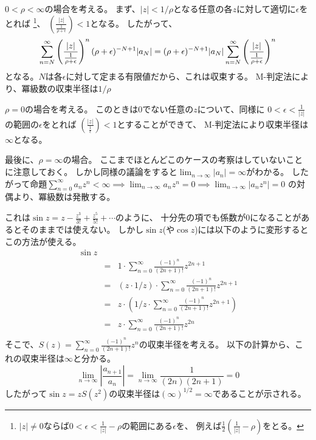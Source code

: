 \documentclass[a4paper]{jarticle}
\begin{document}
\begin{Proof}
            $0 < \rho<\infty$の場合を考える。
            まず、$|z|<1/\rho$となる任意の各$z$に対して適切に$\epsilon$をとれば
            \footnote{ $|z| \neq 0$ならば$0< \epsilon < \frac{1}{|z|} - \rho$の範囲にある$\epsilon$を、
            例えば$\frac{1}{2} \left(\frac{1}{|z|} - \rho \right)$をとる。 }、
            $\left( \frac{|z|}{\frac{1}{\rho+\epsilon}} \right)<1$となる。
            したがって、
            \begin{equation*}
                \sum_{n=N}^{\infty}{ \left( \frac{|z|}{\frac{1}{\rho+\epsilon}} \right)^{n} (\rho+\epsilon)^{-N+1} |a_N|} \\
                =(\rho+\epsilon)^{-N+1} |a_N| \sum_{n=N}^{\infty}{ \left( \frac{|z|}{\frac{1}{\rho+\epsilon}} \right)^{n}}
            \end{equation*}
            となる。$N$は各$\epsilon$に対して定まる有限値だから、これは収束する。
            M-判定法により、冪級数の収束半径は$1/\rho$

            $\rho=0$の場合を考える。
            このときは0でない任意の$z$について、同様に
            $ 0< \epsilon < \frac{1}{|z|}$の範囲の$\epsilon$をとれば
            $\left( \frac{|z|}{\frac{1}{\epsilon}} \right)<1$とすることができて、
            M-判定法により収束半径は$\infty$となる。

            最後に、$\rho=\infty$の場合。
            ここまでほとんどこのケースの考察はしていないことに注意しておく。
            しかし同様の議論をすると$\lim_{n \to \infty}{|a_n|}=\infty$がわかる。
            したがって命題$\sum_{n=0}^{\infty}{a_n z^n} < \infty \implies \lim_{n \to \infty}{a_n z^n}=0 \implies \lim_{n \to \infty}{|a_n z^n|}=0$
            の対偶より、冪級数は発散する。

            \QED
        \end{Proof}

        これは$\sin z=z-\frac{z^3}{3!}+\frac{z^5}{5!}+\cdots$のように、
        十分先の項でも係数が0になることがあるとそのままでは使えない。
        しかし$\sin z$(や$\cos z$)には以下のように変形するとこの方法が使える。
        \begin{eqnarray*}
            \sin z \\
            &=& 1 \cdot \sum_{n=0}^{\infty}{\frac{(-1)^{n}}{(2n+1)!}z^{2n+1}} \\
            &=& (z \cdot 1/z) \cdot \sum_{n=0}^{\infty}{\frac{(-1)^{n}}{(2n+1)!}z^{2n+1}} \\
            &=& z \cdot \left(1/z \cdot \sum_{n=0}^{\infty}{\frac{(-1)^{n}}{(2n+1)!}z^{2n+1}} \right) \\
            &=& z \cdot \sum_{n=0}^{\infty}{\frac{(-1)^{n}}{(2n+1)!}z^{2n}} \\
        \end{eqnarray*}
        そこで、$S(z)=\sum_{n=0}^{\infty}{\frac{(-1)^{n}}{(2n+1)!}z^n}$の収束半径を考える。
        以下の計算から、これの収束半径は$\infty$と分かる。
        \[
            \lim_{n \to \infty} \left| \frac{a_{n+1}}{a_n} \right|
            = \lim_{n \to \infty} \frac{1}{(2n)(2n+1)}=0
        \]
        したがって$\sin z=zS(z^2)$の収束半径は$(\infty)^{1/2}=\infty$であることが示される。
\end{document}
